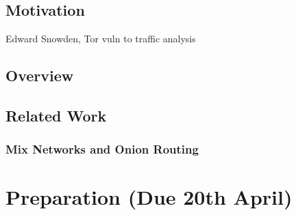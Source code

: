 \documentclass[12pt,a4paper,twoside,openright]{report}
\begin{document}

\section{Motivation}

Edward Snowden, Tor vuln to traffic analysis

\section{Overview}

\section{Related Work}

\subsection{Mix Networks and Onion Routing}


\chapter{Preparation (Due 20th April)}





\end{document}
